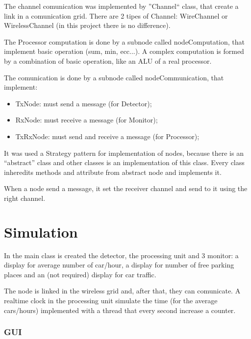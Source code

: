 \documentclass[a4paper,titlepage]{article}
\begin{document}
The channel comunication was implemented by ''Channel`` class, that create a link in a comunication grid. There are 2 tipes of Channel: WireChannel or WirelessChannel (in this project there is no difference).

The Processor computation is done by a subnode called nodeComputation, that implement basic operation (sum, min, ecc...). A complex computation is formed by a combination of basic operation, like an ALU of a real processor.

The comunication is done by a subnode called nodeCommunication, that implement:

\begin{itemize}[noitemsep,topsep=20pt,parsep=10pt,partopsep=20pt]

\item TxNode: must send a message (for Detector);

\item RxNode: must receive a message (for Monitor);

\item TxRxNode: must send and receive a message (for Processor);

\end{itemize}

It was used a Strategy pattern for implementation of nodes, because there is an ``abstract'' class and other classes is an implementation of this class. Every class inheredits methods and attribute from abstract node and implements it. 

When a node send a message, it set the receiver channel and send to it using the right channel.

\newpage
\part{Simulation}

In the main class is created the detector, the processing unit and 3 monitor: a display for average number of car/hour, a display for number of free parking places and an (not required) display for car traffic.

The node is linked in the wireless grid and, after that, they can comunicate. A realtime clock in the processing unit simulate the time (for the average cars/hours) implemented with a thread that every second increase a counter. 

\section{GUI}
\end{document}
